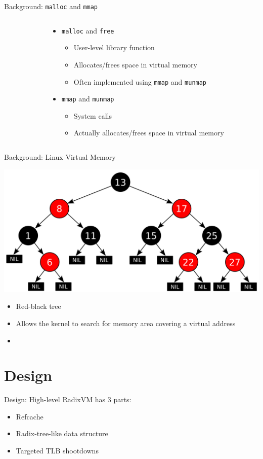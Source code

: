 \documentclass[aspectratio=169]{beamer}
\newcommand{\bi}{\begin{itemize}}
\newcommand{\ei}{\end{itemize}}
\begin{document}
\begin{frame}{Background: \texttt{malloc} and \texttt{mmap}}
\begin{columns}[T]
\begin{column}{0.2\textwidth}
    \end{column}
    \begin{column}{0.8\textwidth}
      \bi
    \item \texttt{malloc} and \texttt{free}
      \bi
    \item User-level library function
    \item Allocates/frees space in virtual memory
    \item Often implemented using \texttt{mmap} and \texttt{munmap}
      \ei
    \item \texttt{mmap} and \texttt{munmap}
      \bi
    \item System calls
    \item Actually allocates/frees space in virtual memory
      \ei
      \ei
    \end{column}
  \end{columns}
\end{frame}

\begin{frame}{Background: Linux Virtual Memory}
  \begin{center}
    \includegraphics[scale=0.2]{./figures/Red-black_tree.png}
    \bi
    \item Red-black tree
    \item Allows the kernel to search for memory area covering a virtual address
      \pause
    \item \color{red}{Problem: A single lock per address space!}
    \ei
  \end{center}
\end{frame}

\section{Design}

\begin{frame}{Design: High-level}
  RadixVM has 3 parts:
  \begin{center}
    \bi
  \item Refcache
  \item Radix-tree-like data structure
  \item Targeted TLB shootdowns
    \ei
  \end{center}
\end{frame}
\end{document}
